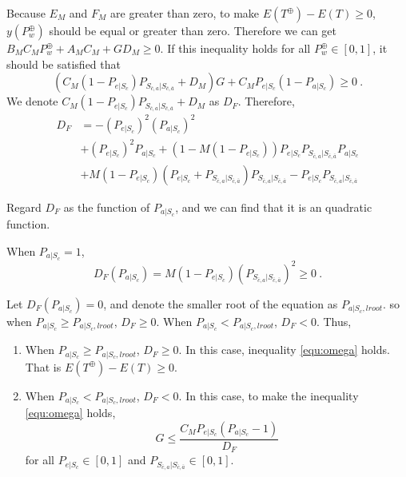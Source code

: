 Because $E_{M}$ and $F_{M}$ are greater than zero, to make $E(T^{\oplus}) - E(T) \geq 0$, $y(P_{w}^{\oplus})$ should be equal or greater than zero.
Therefore we can get $ B_{M}C_{M}P_{w}^{\oplus}+A_{M}C_{M}+GD_{M} \geq 0$.
If this inequality holds for all $P_{w}^{\oplus} \in [0,1]$, it should be satisfied that
\begin{equation}\label{equ:omega}
  (C_{M}(1-P_{e|S_{c}})P_{S_{\bar{c}, a}|S_{\bar{c},\bar{a}}}+D_{M})G+C_{M}P_{e|S_{c}}(1-P_{a|S_{c}}) \geq 0 \ .
\end{equation}
We denote $C_{M}(1-P_{e|S_{c}})P_{S_{\bar{c}, a}|S_{\bar{c},\bar{a}}}+D_{M}$ as $D_{F}$.
Therefore,
\begin{equation}
\begin{split}
D_{F} &=-(P_{e|S_{c}})^2(P_{a|S_{c}})^2  \\
&+(P_{e|S_{c}})^2P_{a|S_{c}}+(1-M(1-P_{e|S_{c}}))P_{e|S_{c}}P_{S_{\bar{c}, a}|S_{\bar{c},\bar{a}}}P_{a|S_{c}}\\
&+M(1-P_{e|S_{c}})(P_{e|S_{c}}+P_{S_{\bar{c}, a}|S_{\bar{c},\bar{a}}})P_{S_{\bar{c}, a}|S_{\bar{c},\bar{a}}}-P_{e|S_{c}}P_{S_{\bar{c}, a}|S_{\bar{c},\bar{a}}}
\end{split}\end{equation}

Regard $D_{F}$ as the function of $P_{a|S_{c}}$,
and we can find that it is an quadratic function.

When $P_{a|S_{c}} = 1$,
$$D_{F}(P_{a|S_{c}})=M(1-P_{e|S_{c}})(P_{S_{\bar{c}, a}|S_{\bar{c},\bar{a}}})^2 \geq 0 \ .$$

Let $D_{F}(P_{a|S_{c}}) = 0$,
 and denote the smaller root of the equation as $P_{a|S_{c},lroot}$.
  so when $P_{a|S_{c}} \geq P_{a|S_{c},lroot}$, $D_{F} \geq 0$.
   When $P_{a|S_{c}} < P_{a|S_{c},lroot}$, $D_{F} < 0$.
 Thus,
\begin{enumerate}
  \item
  When $P_{a|S_{c}} \geq P_{a|S_{c},lroot}$, $D_{F} \geq 0$.
  In this case, inequality \ref{equ:omega} holds. That is $E(T^{\oplus}) - E(T) \geq 0$.
  \item
  When $P_{a|S_{c}} < P_{a|S_{c},lroot}$, $D_{F} < 0$.
   In this case, to make the inequality \ref{equ:omega} holds,
   \begin{equation}\label{equ:ge}
     G \leq \frac{C_{M}P_{e|S_{c}}(P_{a|S_{c}}-1)}{D_{F}}
   \end{equation}
    for all $P_{e|S_{c}} \in [0,1]$ and $P_{S_{\bar{c}, a}|S_{\bar{c},\bar{a}}} \in [0,1]$.
\end{enumerate}

